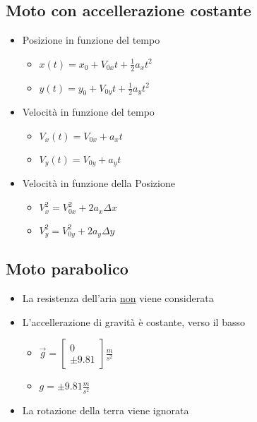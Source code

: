 \documentclass[../main.tex]{subfiles}
\begin{document}
\vspace{1cm}
\subsection{Moto con accellerazione costante}
\begin{itemize}
    \item Posizione in funzione del tempo
    \begin{itemize}
        \item $x(t) = x_0 + V_{0x}t + \frac{1}{2}a_xt^2$
        \item $y(t) = y_0 + V_{0y}t + \frac{1}{2}a_yt^2$
    \end{itemize}
    \item Velocità in funzione del tempo
    \begin{itemize}
        \item $V_x(t) = V_{0x} + a_xt$
        \item $V_y(t) = V_{0y} + a_yt$
    \end{itemize}
    \item Velocità in funzione della Posizione
    \begin{itemize}
        \item $V_x^2 = V_{0x}^2 + 2a_x\Delta x$
        \item $V_y^2 = V_{0y}^2 + 2a_y\Delta y$
    \end{itemize}
\end{itemize}

\vspace{1cm}
\subsection{Moto parabolico}
\begin{itemize}
    \item La resistenza dell'aria \underline{non} viene considerata
    \item L'accellerazione di gravità è costante, verso il basso 
    \begin{itemize}
        \item $\vec{g} = \begin{bmatrix}
            0 \\
            \pm 9.81
        \end{bmatrix}\frac{m}{s^2}$
        \item $g = \pm 9.81\frac{m}{s^2}$
    \end{itemize}
    \item La rotazione della terra viene ignorata
\end{itemize}
\end{document}
